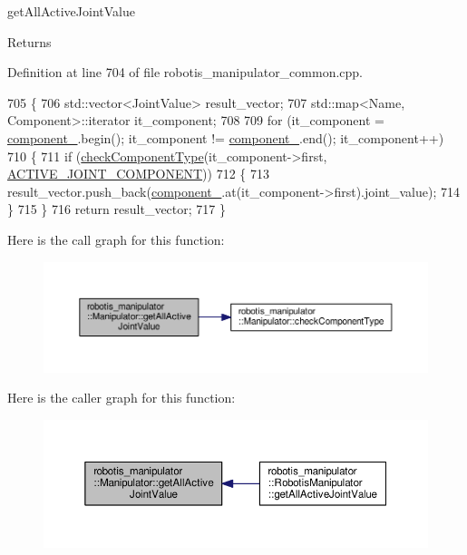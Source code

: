 get\+All\+Active\+Joint\+Value 

\begin{DoxyReturn}{Returns}

\end{DoxyReturn}


Definition at line 704 of file robotis\+\_\+manipulator\+\_\+common.\+cpp.


\begin{DoxyCode}
705 \{
706   std::vector<JointValue> result\_vector;
707   std::map<Name, Component>::iterator it\_component;
708 
709   \textcolor{keywordflow}{for} (it\_component = \hyperlink{classrobotis__manipulator_1_1_manipulator_a20b388b821f161972c2cf737fe1c26db}{component\_}.begin(); it\_component != \hyperlink{classrobotis__manipulator_1_1_manipulator_a20b388b821f161972c2cf737fe1c26db}{component\_}.end(); 
      it\_component++)
710   \{
711     \textcolor{keywordflow}{if} (\hyperlink{classrobotis__manipulator_1_1_manipulator_a5b1f27b9cc2875b4e0275e3b88ab1b28}{checkComponentType}(it\_component->first, 
      \hyperlink{namespacerobotis__manipulator_a2bbf89d1c08dc1d9ff4e28beb939e382acdf3b34914d1a2a028d882beb96fba7c}{ACTIVE\_JOINT\_COMPONENT}))
712     \{
713       result\_vector.push\_back(\hyperlink{classrobotis__manipulator_1_1_manipulator_a20b388b821f161972c2cf737fe1c26db}{component\_}.at(it\_component->first).joint\_value);
714     \}
715   \}
716   \textcolor{keywordflow}{return} result\_vector;
717 \}
\end{DoxyCode}


Here is the call graph for this function\+:\nopagebreak
\begin{figure}[H]
\begin{center}
\leavevmode
\includegraphics[width=350pt]{classrobotis__manipulator_1_1_manipulator_ae11f05005b456e13ef17585a70179dce_cgraph}
\end{center}
\end{figure}




Here is the caller graph for this function\+:\nopagebreak
\begin{figure}[H]
\begin{center}
\leavevmode
\includegraphics[width=350pt]{classrobotis__manipulator_1_1_manipulator_ae11f05005b456e13ef17585a70179dce_icgraph}
\end{center}
\end{figure}


